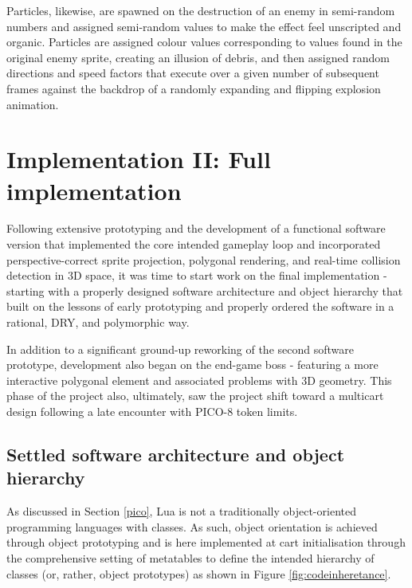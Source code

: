 \documentclass[11pt]{article}
\begin{document}
Particles, likewise, are spawned on the destruction of an enemy in semi-random numbers and assigned semi-random
values to make the effect feel unscripted and organic. Particles are assigned colour values corresponding to
values found in the original enemy sprite, creating an illusion of debris, and then assigned random directions
and speed factors that execute over a given number of subsequent frames against the backdrop of a randomly
expanding and flipping explosion animation.


\section{Implementation II: Full implementation}

Following extensive prototyping and the development of a functional software version that
implemented the core intended gameplay loop and incorporated perspective-correct sprite projection,
polygonal rendering, and real-time collision detection in 3D space, it was time to start work on
the final implementation - starting with a properly designed software architecture and object
hierarchy that built on the lessons of early prototyping and properly ordered the software in
a rational, DRY, and polymorphic way.

In addition to a significant ground-up reworking of the second software prototype, development
also began on the end-game boss - featuring a more interactive polygonal element and associated
problems with 3D geometry. This phase of the project also, ultimately, saw the project shift toward
a multicart design following a late encounter with PICO-8 token limits.

\subsection{Settled software architecture and object hierarchy}
As discussed in Section \ref{pico}, Lua is not a traditionally object-oriented programming
languages with classes. As such, object orientation is achieved through object prototyping and
is here implemented at cart initialisation through the comprehensive setting of metatables
to define the intended hierarchy of classes (or, rather, object prototypes) as shown in Figure
\ref{fig:codeinheretance}.
\end{document}
